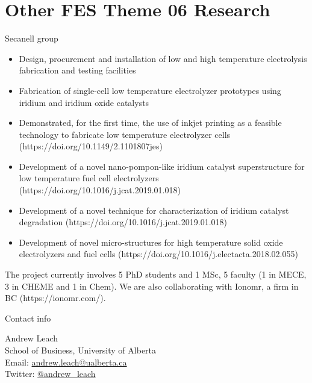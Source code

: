 \documentclass{beamer}
\begin{document}
\section{Other FES Theme 06 Research}
\begin{frame} Secanell group
\footnotesize{\begin{itemize}
  \item Design, procurement and installation of low and high temperature electrolysis fabrication and testing facilities
  \item Fabrication of single-cell low temperature electrolyzer prototypes using iridium and iridium oxide catalysts
  \item Demonstrated, for the first time, the use of inkjet printing as a feasible technology to fabricate low temperature electrolyzer cells  (https://doi.org/10.1149/2.1101807jes)
   \item Development of a novel nano-pompon-like iridium catalyst superstructure for low temperature fuel cell electrolyzers (https://doi.org/10.1016/j.jcat.2019.01.018)
   \item Development of a novel technique for characterization of iridium catalyst degradation (https://doi.org/10.1016/j.jcat.2019.01.018)
 \item Development of novel micro-structures for high temperature solid oxide electrolyzers and fuel cells (https://doi.org/10.1016/j.electacta.2018.02.055)
  \end{itemize}}
The project currently involves 5 PhD students and 1 MSc, 5 faculty (1 in MECE, 3 in CHEME and 1 in Chem). We are also collaborating with Ionomr, a firm in BC (https://ionomr.com/).
   \vfill
\end{frame}



\begin{frame}{Contact info}
\begin{center}
Andrew Leach\bigskip \\
School of Business, University of Alberta\bigskip \\
Email: \href{mailto:aleach@ualberta.ca}{andrew.leach@ualberta.ca}\bigskip \\
Twitter: \href{http://twitter.com/andrew_leach}{\url{@andrew_leach}}
\end{center}
\vfill
\end{frame}
\end{document}
